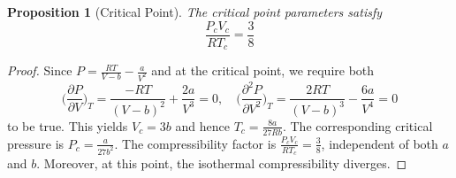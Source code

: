 \documentclass[a4paper]{article}
\theoremstyle{new}
\newtheorem{prop}{Proposition}[section]
\begin{document}
\begin{prop}[Critical Point]
The critical point parameters satisfy
\begin{equation}
\frac{P_cV_c}{RT_c}=\frac{3}{8}\label{crit}
\end{equation}
\end{prop}
\begin{proof}
Since $P=\frac{RT}{V-b}-\frac{a}{V^2}$ and at the critical point, we require both
$$\bigg(\frac{\partial P}{\partial V}\bigg)_T=\frac{-RT}{(V-b)^2}+\frac{2a}{V^3}=0,\quad \bigg(\frac{\partial^2 P}{\partial V^2}\bigg)_T=\frac{2RT}{(V-b)^3}-\frac{6a}{V^4}=0$$
to be true. This yields $V_c=3b$ and hence $T_c=\frac{8a}{27Rb}$. The corresponding critical pressure is $P_c=\frac{a}{27b^2}$. The compressibility factor is $\frac{P_cV_c}{RT_c}=\frac{3}{8}$, independent of both $a$ and $b$. Moreover, at this point, the isothermal compressibility diverges.
\end{proof}
\newpage
\end{document}
